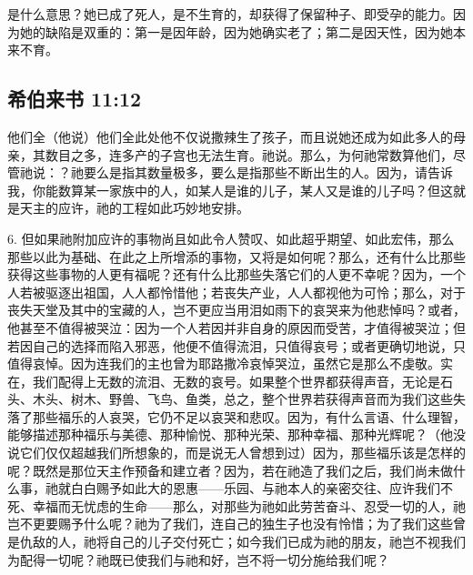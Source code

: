 是什么意思？她已成了死人，是不生育的，却获得了保留种子、即受孕的能力。因为她的缺陷是双重的：第一是因年龄，因为她确实老了；第二是因天性，因为她本来不育。\par


\subsection{希伯来书 11:12}

他们全（他说）他们全此处他不仅说撒辣生了孩子，而且说她还成为如此多人的母亲，其数目之多，连多产的子宫也无法生育。祂说。那么，为何祂常数算他们，尽管祂说：？祂要么是指其数量极多，要么是指那些不断出生的人。因为，请告诉我，你能数算某一家族中的人，如某人是谁的儿子，某人又是谁的儿子吗？但这就是天主的应许，祂的工程如此巧妙地安排。\par

6. 但如果祂附加应许的事物尚且如此令人赞叹、如此超乎期望、如此宏伟，那么那些以此为基础、在此之上所增添的事物，又将是如何呢？那么，还有什么比那些获得这些事物的人更有福呢？还有什么比那些失落它们的人更不幸呢？因为，一个人若被驱逐出祖国，人人都怜惜他；若丧失产业，人人都视他为可怜；那么，对于丧失天堂及其中的宝藏的人，岂不更应当用泪如雨下的哀哭来为他悲悼吗？或者，他甚至不值得被哭泣：因为一个人若因并非自身的原因而受苦，才值得被哭泣；但若因自己的选择而陷入邪恶，他便不值得流泪，只值得哀号；或者更确切地说，只值得哀悼。因为连我们的主也曾为耶路撒冷哀悼哭泣，虽然它是那么不虔敬。实在，我们配得上无数的流泪、无数的哀号。如果整个世界都获得声音，无论是石头、木头、树木、野兽、飞鸟、鱼类，总之，整个世界若获得声音而为我们这些失落了那些福乐的人哀哭，它仍不足以哀哭和悲叹。因为，有什么言语、什么理智，能够描述那种福乐与美德、那种愉悦、那种光荣、那种幸福、那种光辉呢？（他没说它们仅仅超越我们所想象的，而是说无人曾想到过）因为，那些福乐该是怎样的呢？既然是那位天主作预备和建立者？因为，若在祂造了我们之后，我们尚未做什么事，祂就白白赐予如此大的恩惠——乐园、与祂本人的亲密交往、应许我们不死、幸福而无忧虑的生命——那么，对那些为祂如此劳苦奋斗、忍受一切的人，祂岂不更要赐予什么呢？祂为了我们，连自己的独生子也没有怜惜；为了我们这些曾是仇敌的人，祂将自己的儿子交付死亡；如今我们已成为祂的朋友，祂岂不视我们为配得一切呢？祂既已使我们与祂和好，岂不将一切分施给我们呢？\par

